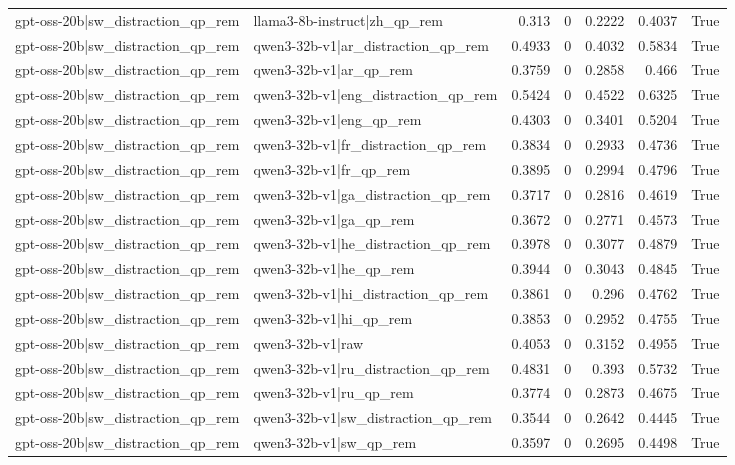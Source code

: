 \begin{table}
\begin{tabular}{l l r r r r l}
gpt-oss-20b|sw_distraction_qp_rem & llama3-8b-instruct|zh_qp_rem & 0.313 & 0 & 0.2222 & 0.4037 & True \\
gpt-oss-20b|sw_distraction_qp_rem & qwen3-32b-v1|ar_distraction_qp_rem & 0.4933 & 0 & 0.4032 & 0.5834 & True \\
gpt-oss-20b|sw_distraction_qp_rem & qwen3-32b-v1|ar_qp_rem & 0.3759 & 0 & 0.2858 & 0.466 & True \\
gpt-oss-20b|sw_distraction_qp_rem & qwen3-32b-v1|eng_distraction_qp_rem & 0.5424 & 0 & 0.4522 & 0.6325 & True \\
gpt-oss-20b|sw_distraction_qp_rem & qwen3-32b-v1|eng_qp_rem & 0.4303 & 0 & 0.3401 & 0.5204 & True \\
gpt-oss-20b|sw_distraction_qp_rem & qwen3-32b-v1|fr_distraction_qp_rem & 0.3834 & 0 & 0.2933 & 0.4736 & True \\
gpt-oss-20b|sw_distraction_qp_rem & qwen3-32b-v1|fr_qp_rem & 0.3895 & 0 & 0.2994 & 0.4796 & True \\
gpt-oss-20b|sw_distraction_qp_rem & qwen3-32b-v1|ga_distraction_qp_rem & 0.3717 & 0 & 0.2816 & 0.4619 & True \\
gpt-oss-20b|sw_distraction_qp_rem & qwen3-32b-v1|ga_qp_rem & 0.3672 & 0 & 0.2771 & 0.4573 & True \\
gpt-oss-20b|sw_distraction_qp_rem & qwen3-32b-v1|he_distraction_qp_rem & 0.3978 & 0 & 0.3077 & 0.4879 & True \\
gpt-oss-20b|sw_distraction_qp_rem & qwen3-32b-v1|he_qp_rem & 0.3944 & 0 & 0.3043 & 0.4845 & True \\
gpt-oss-20b|sw_distraction_qp_rem & qwen3-32b-v1|hi_distraction_qp_rem & 0.3861 & 0 & 0.296 & 0.4762 & True \\
gpt-oss-20b|sw_distraction_qp_rem & qwen3-32b-v1|hi_qp_rem & 0.3853 & 0 & 0.2952 & 0.4755 & True \\
gpt-oss-20b|sw_distraction_qp_rem & qwen3-32b-v1|raw & 0.4053 & 0 & 0.3152 & 0.4955 & True \\
gpt-oss-20b|sw_distraction_qp_rem & qwen3-32b-v1|ru_distraction_qp_rem & 0.4831 & 0 & 0.393 & 0.5732 & True \\
gpt-oss-20b|sw_distraction_qp_rem & qwen3-32b-v1|ru_qp_rem & 0.3774 & 0 & 0.2873 & 0.4675 & True \\
gpt-oss-20b|sw_distraction_qp_rem & qwen3-32b-v1|sw_distraction_qp_rem & 0.3544 & 0 & 0.2642 & 0.4445 & True \\
gpt-oss-20b|sw_distraction_qp_rem & qwen3-32b-v1|sw_qp_rem & 0.3597 & 0 & 0.2695 & 0.4498 & True \\

\end{tabular}
\end{table}
